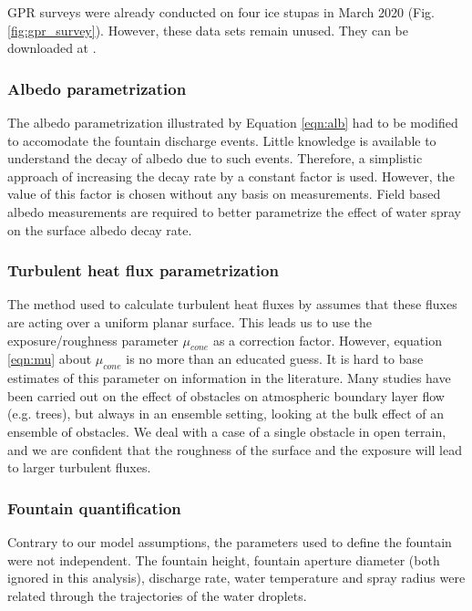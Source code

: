 \ac{GPR} surveys were already conducted on four ice stupas in March 2020 (Fig. \ref{fig:gpr_survey}). However,
these data sets remain unused. They can be downloaded at \citet{balasubramanian_suryanarayanan_2022_7056646}.

\subsubsection{Albedo parametrization}

The albedo parametrization illustrated by Equation \ref{eqn:alb} had to be modified to accomodate the fountain
discharge events. Little knowledge is available to understand the decay of albedo due to such events. Therefore,
a simplistic approach of increasing the decay rate by a constant factor is used. However, the value of this
factor is chosen without any basis on measurements. Field based albedo measurements are required to better
parametrize the effect of water spray on the surface albedo decay rate.

\subsubsection{Turbulent heat flux parametrization}

The method used to calculate turbulent heat fluxes by \citet{garrattAtmosphericBoundaryLayer1992} assumes that
these fluxes are acting over a uniform planar surface. This leads us to use the exposure/roughness parameter
$\mu_{cone}$ as a correction factor. However, equation \ref{eqn:mu} about $\mu_{cone}$ is no more than an
educated guess. It is hard to base estimates of this parameter on information in the literature. Many studies
have been carried out on the effect of obstacles on atmospheric boundary layer flow (e.g. trees), but always in
an ensemble setting, looking at the bulk effect of an ensemble of obstacles. We deal with a case of a single
obstacle in open terrain, and we are confident that the roughness of the surface and the exposure will lead to
larger turbulent fluxes.

\subsubsection{Fountain quantification}

Contrary to our model assumptions, the parameters used to define the fountain were not independent. The fountain
height, fountain aperture diameter (both ignored in this analysis), discharge rate, water temperature and spray
radius were related through the trajectories of the water droplets.

